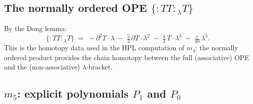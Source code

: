 \documentclass[11pt]{article}
\newcommand{\normord}[1]{:\!#1\!:}
\begin{document}
\subsection{The normally ordered OPE $\{\normord{TT}{}_\lambda T\}$}

By the Dong lemma:
\begin{equation}\label{eq:TT-T-rectified}
\{\normord{TT}{}_\lambda T\}
\;=\;
-\partial^2 T\cdot\lambda
\;-\; \tfrac{5}{2}\,\partial T\cdot\lambda^2
\;-\; \tfrac{4}{3}\, T\cdot\lambda^3
\;-\; \tfrac{c}{40}\,\lambda^5.
\end{equation}
This is the homotopy data used in the HPL computation of $m_4$:
the normally ordered product provides the chain homotopy between
the full (associative) OPE and the (non-associative)
$\lambda$-bracket.

\subsection{$m_5$: explicit polynomials $P_1$ and $P_0$}
\end{document}
